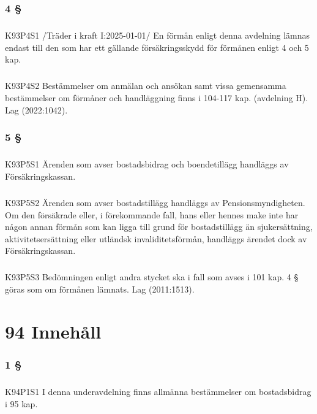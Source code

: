 \documentclass[a4paper,notitlepage,openany,10pt]{book}
\begin{document}
\subsection*{4 §}
\paragraph*{}
{\tiny K93P4S1}
/Träder i kraft I:2025-01-01/
En förmån enligt denna avdelning lämnas endast till den som har ett gällande försäkringsskydd för förmånen enligt 4 och 5 kap.
\paragraph*{}
{\tiny K93P4S2}
Bestämmelser om anmälan och ansökan samt vissa gemensamma bestämmelser om förmåner och handläggning finns i 104-117 kap. (avdelning H).
Lag (2022:1042).
\subsection*{5 §}
\paragraph*{}
{\tiny K93P5S1}
Ärenden som avser bostadsbidrag och boendetillägg handläggs av Försäkringskassan.
\paragraph*{}
{\tiny K93P5S2}
Ärenden som avser bostadstillägg handläggs av Pensionsmyndigheten. Om den försäkrade eller, i förekommande fall, hans eller hennes make inte har någon annan förmån som kan ligga till grund för bostadstillägg än sjukersättning, aktivitetsersättning eller utländsk invaliditetsförmån, handläggs ärendet dock av Försäkringskassan.
\paragraph*{}
{\tiny K93P5S3}
Bedömningen enligt andra stycket ska i fall som avses i 101 kap. 4 § göras som om förmånen lämnats.
Lag (2011:1513).
\chapter*{94 Innehåll}
\subsection*{1 §}
\paragraph*{}
{\tiny K94P1S1}
I denna underavdelning finns allmänna bestämmelser om bostadsbidrag i 95 kap.
\end{document}

